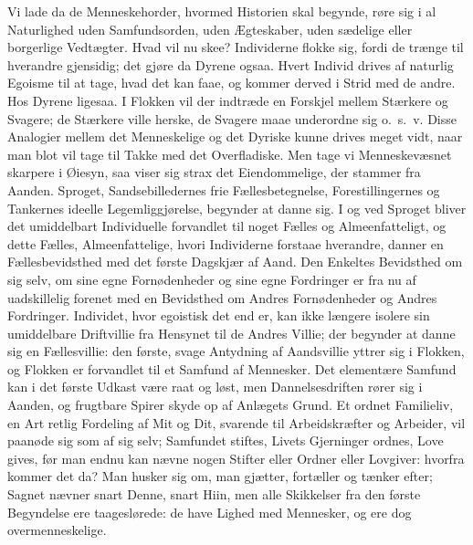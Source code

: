 \documentclass[12pt]{book}
\newcommand{\apage}[1]{\marginnote{\footnotesize\textit{[#1]}}}
\begin{document}
Vi lade da de Menneskehorder, hvormed Historien skal begynde, røre sig i al
Naturlighed uden Samfundsorden, uden Ægteskaber, uden sædelige eller
borgerlige Vedtægter. Hvad vil nu skee? Individerne flokke sig, fordi de
trænge til hverandre gjensidig; det gjøre da Dyrene ogsaa. Hvert Individ
drives af naturlig Egoisme til at tage, hvad det kan faae, og kommer derved
i Strid med de andre. Hos Dyrene ligesaa. I Flokken vil der indtræde en
Forskjel mellem Stærkere og Svagere; de Stærkere ville herske, de Svagere
maae underordne sig o.\ s.\ v. Disse Analogier mellem det Menneskelige og det
Dyriske kunne drives meget vidt, \apage{235} naar man blot vil tage til Takke med det
Overfladiske. Men tage vi Menneskevæsnet skarpere i Øiesyn, saa viser sig
strax det Eiendommelige, der stammer fra Aanden. Sproget, Sandsebilledernes
frie Fællesbetegnelse, Forestillingernes og Tankernes ideelle
Legemliggjørelse, begynder at danne sig. I og ved Sproget bliver det
umiddelbart Individuelle forvandlet til noget Fælles og Almeenfatteligt, og
dette Fælles, Almeenfattelige, hvori Individerne forstaae hverandre, danner
en Fællesbevidsthed med det første Dagskjær af Aand. Den Enkeltes Bevidsthed
om sig selv, om sine egne Fornødenheder og sine egne Fordringer er fra nu af
uadskillelig forenet med en Bevidsthed om Andres Fornødenheder og Andres
Fordringer. Individet, hvor egoistisk det end er, kan ikke længere isolere
sin umiddelbare Driftvillie fra Hensynet til de Andres Villie; der begynder
at danne sig en Fællesvillie: den første, svage Antydning af Aandsvillie
yttrer sig i Flokken, og Flokken er forvandlet til et Samfund af Mennesker.
Det elementære Samfund kan i det første Udkast være raat og løst, men
Dannelsesdriften rører sig i Aanden, og frugtbare Spirer skyde op af
Anlægets Grund. Et ordnet Familieliv, en Art retlig Fordeling af Mit og Dit,
svarende til Arbeidskræfter og Arbeider, vil paanøde sig som af sig selv;
Samfundet stiftes, Livets Gjerninger ordnes, Love gives, før man endnu kan
nævne nogen Stifter eller Ordner eller Lovgiver: hvorfra kommer det da? Man
husker sig om, man gjætter, fortæller og tænker efter; Sagnet nævner snart
Denne, snart Hiin, men alle Skikkelser fra den første  \apage{236} Begyndelse ere
taageslørede: de have Lighed med Mennesker, og ere dog overmenneskelige.
\end{document}
